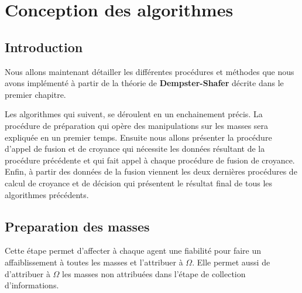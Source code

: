 \chapter{Conception des algorithmes}

{}
\section*{Introduction}

Nous allons maintenant détailler les différentes procédures et méthodes que nous avons implémenté à partir de la théorie de\textbf{ Dempster-Shafer} décrite dans le premier chapitre.

Les algorithmes qui suivent, se déroulent en un enchainement précis.
La procédure de préparation qui opère des manipulations sur les masses sera expliquée en un premier temps. Ensuite nous allons présenter la procédure d'appel de fusion et de croyance qui nécessite les données résultant de la procédure précédente et qui fait appel à chaque procédure de fusion de croyance. Enfin, à partir des données de la fusion viennent les deux dernières procédures de calcul de croyance et de décision qui présentent le résultat final de tous les algorithmes précédents.

\DontPrintSemicolon
\section{Preparation des masses}
Cette étape permet d'affecter à chaque agent une fiabilité pour faire un affaiblissement à toutes les masses et l'attribuer à $\Omega$. Elle permet aussi de d'attribuer à $\Omega$ les masses non attribuées dans l'étape de collection d'informations.   


